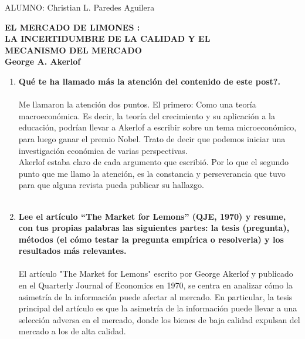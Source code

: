 ALUMNO: Christian L. Paredes Aguilera\\

\vspace{1cm}

\begin{center}
    \large
    \textbf{EL MERCADO DE LIMONES :\\
    LA INCERTIDUMBRE DE LA CALIDAD Y EL \\
    MECANISMO DEL MERCADO}\\
    \vspace{.5cm}
    \normalsize
    \textbf{George A. Akerlof}
\end{center}

\vspace{2cm}

\begin{enumerate}[\bfseries 1.]

    \item \textbf{Qué te ha llamado más la atención del contenido de este post?.}\\\\

	Me llamaron la atención dos puntos. El primero: Como una teoría macroeconómica. Es decir, la teoría del crecimiento y su aplicación a la educación, podrían llevar a Akerlof a escribir sobre un tema microeconómico, para luego ganar el premio Nobel. Trato de decir que podemos iniciar una investigación económica de varias perspectivas. \\
	 Akerlof estaba claro de cada argumento que escribió. Por lo que el segundo punto que me llamo la atención, es la constancia y perseverancia que tuvo para que alguna revista pueda publicar su hallazgo. \\\\

    \item \textbf{Lee el artículo “The Market for Lemons” (QJE, 1970) y resume, con tus propias palabras las siguientes partes: la tesis (pregunta), métodos (el cómo testar la pregunta empírica o resolverla) y los resultados más relevantes.}\\\\

    El artículo "The Market for Lemons" escrito por George Akerlof y publicado en el Quarterly Journal of Economics en 1970, se centra en analizar cómo la asimetría de la información puede afectar al mercado. En particular, la tesis principal del artículo es que la asimetría de la información puede llevar a una selección adversa en el mercado, donde los bienes de baja calidad expulsan del mercado a los de alta calidad.\\


\end{enumerate}
